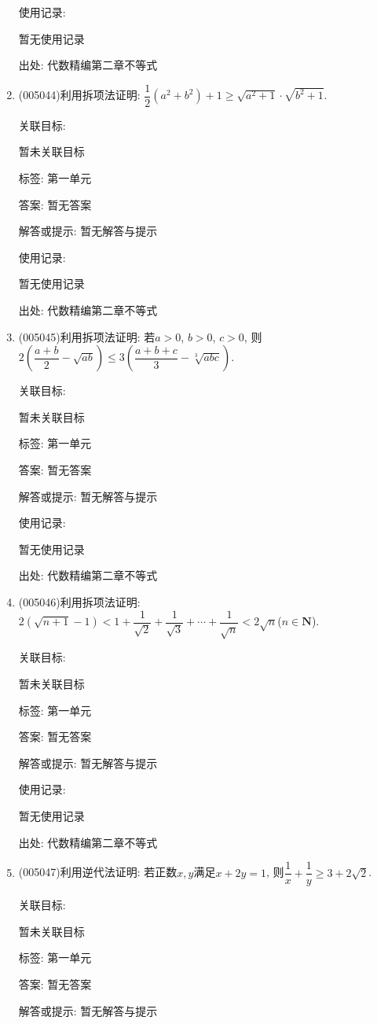 \documentclass[10pt,a4paper]{article}
\begin{document}
\begin{enumerate}[1.]
使用记录:

暂无使用记录


出处: 代数精编第二章不等式
\item { (005044)}利用拆项法证明: $\dfrac 12({a^2}+{b^2})+1\ge \sqrt{{a^2}+1}\cdot \sqrt{{b^2}+1}$.


关联目标:

暂未关联目标



标签: 第一单元

答案: 暂无答案

解答或提示: 暂无解答与提示

使用记录:

暂无使用记录


出处: 代数精编第二章不等式
\item { (005045)}利用拆项法证明: 若$a>0$, $b>0$, $c>0$, 则$2(\dfrac{a+b}2-\sqrt{ab})\le 3(\dfrac{a+b+c}3-\sqrt[3]{abc})$.


关联目标:

暂未关联目标



标签: 第一单元

答案: 暂无答案

解答或提示: 暂无解答与提示

使用记录:

暂无使用记录


出处: 代数精编第二章不等式
\item { (005046)}利用拆项法证明: $2(\sqrt{n+1}-1)<1+\dfrac 1{\sqrt 2}+\dfrac 1{\sqrt 3}+\cdots +\dfrac 1{\sqrt n}<2\sqrt n$($n\in \mathbf{N}$).


关联目标:

暂未关联目标



标签: 第一单元

答案: 暂无答案

解答或提示: 暂无解答与提示

使用记录:

暂无使用记录


出处: 代数精编第二章不等式
\item { (005047)}利用逆代法证明: 若正数$x,y$满足$x+2y=1$, 则$\dfrac 1x+\dfrac 1y\ge 3+2\sqrt 2$.


关联目标:

暂未关联目标



标签: 第一单元

答案: 暂无答案

解答或提示: 暂无解答与提示


\end{enumerate}
\end{document}
